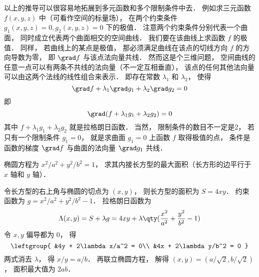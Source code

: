 以上的推导可以很容易地拓展到多元函数和多个限制条件中去． 例如求三元函数 $f(x,y,z)$ 中（可看作空间的标量场）， 在两个约束条件 $g_1(x,y,z) = 0, g_2(x,y,z) = 0$ 下的极值． 注意两个约束条件分别代表一个曲面， 同时成立代表两个曲面相交的空间曲线． 我们要在该曲线上求函数 $f$ 的极值． 同样， 若曲线上的某点是极值， 那必须满足曲线在该点的切线方向 $f$ 的方向导数为零， 即 $\grad f$ 与该点法向量共线． 然而这是个三维问题， 空间曲线的任意一点可以有两条不共线的法向量（不一定互相垂直）， 该点的任何其他法向量可以由这两个法线的线性组合来表示． 即存在常数 $\lambda_1$ 和 $\lambda_2$， 使得
\begin{equation}
\grad f + \lambda_1 \grad g_1 + \lambda_2 \grad g_2 = 0
\end{equation}
即
\begin{equation}
\grad (f + \lambda_1 g_1 + \lambda_2 g_2) = 0
\end{equation}
其中 $f + \lambda_1 g_1 + \lambda_2 g_2$ 就是拉格朗日函数． 当然， 限制条件的数目不一定是2， 若只有一个限制条件 $g_1 = 0$， 就是求曲面 $g_1 = 0$ 上函数 $f$ 取得极值的点， 条件是函数的梯度 $\grad f$ 与曲面的法向量 $\grad g_1$ 共线．

\begin{example}{}
椭圆方程为 $x^2/a^2 + y^2/b^2 = 1$， 求其内接长方型的最大面积（长方形的边平行于 $x$ 轴和 $y$ 轴）．

令长方型的右上角与椭圆的切点为 $(x,y)$， 则长方型的面积为 $S = 4xy$． 约束函数为 $g = x^2/a^2 + y^2/b^2 - 1$． 拉格朗日函数为
\begin{equation}
\Lambda(x,y) = S + \lambda g = 4xy + \lambda \qty(\frac{x^2}{a^2} + \frac{y^2}{b^2} - 1)
\end{equation}
令 $x, y$ 偏导都为 0， 得
\begin{equation}\leftgroup{
&4y + 2\lambda x/a^2 = 0\\
&4x + 2\lambda y/b^2 = 0
}\end{equation}
两式消去 $\lambda$， 得 $x/y = a/b$． 再联立椭圆方程， 解得 $(x,y) = (a/\sqrt{2}, b/\sqrt{2})$， 面积最大值为 $2ab$．
\end{example}